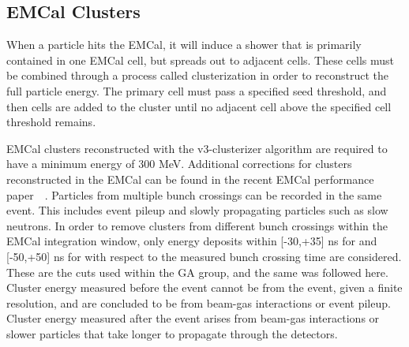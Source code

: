 \subsection{EMCal Clusters}
\label{sec:ClusterSelection}

When a particle hits the EMCal, it will induce a shower that is primarily contained in one EMCal cell, but spreads out to adjacent cells. These cells must be combined through a process called clusterization in order to reconstruct the full particle energy. The primary cell must pass a specified seed threshold, and then cells are added to the cluster until no adjacent cell above the specified cell threshold remains.

EMCal clusters reconstructed with the v3-clusterizer algorithm are required to have a minimum energy of 300 MeV. Additional corrections for clusters reconstructed in the EMCal can be found in the recent EMCal performance paper~~\cite{EMCalPerformance2022}. Particles from multiple bunch crossings can be recorded in the same event. This includes event pileup and slowly propagating particles such as slow neutrons. In order to remove clusters from different bunch crossings within the EMCal integration window, only energy deposits within [-30,+35] ns for \pp and [-50,+50] ns for \pPb with respect to the measured bunch crossing time are considered. These are the cuts used within the GA group, and the same was followed here. Cluster energy measured before the event cannot be from the event, given a finite resolution, and are concluded to be from beam-gas interactions or event pileup. Cluster energy measured after the event arises from beam-gas interactions or slower particles that take longer to propagate through the detectors. 

